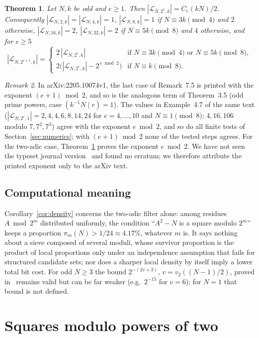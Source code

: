 \documentclass[11pt]{amsart}
\newtheorem{theorem}{Theorem}
\theoremstyle{remark}
\newtheorem{remark}[theorem]{Remark}
\newcommand{\Lset}{\mathcal{L}}
\begin{document}
\begin{theorem}\label{thm:hyp}
Let $N,k$ be odd and $e\ge1$. Then $|\Lset_{N,2^e,k}|=C_e(kN)/2$. Consequently $|\Lset_{N,2,k}|=|\Lset_{N,4,k}|=1$, $|\Lset_{N,8,k}|=1$ if $N\equiv3k\pmod4$ and $2$ otherwise, $|\Lset_{N,16,k}|=2$, $|\Lset_{N,32,k}|=2$ if $N\equiv5k\pmod8$ and $4$ otherwise, and for $e\ge5$
\[
|\Lset_{N,2^{e+1},k}|=
\begin{cases}
2\,|\Lset_{N,2^e,k}| & \text{if } N\equiv3k\pmod 4 \text{ or } N\equiv5k\pmod8,\\
2\bigl(|\Lset_{N,2^e,k}|-2^{\,e \bmod 2}\bigr) & \text{if } N\equiv k\pmod8.
\end{cases}
\]
\end{theorem}

\begin{remark}\label{rem:exponent}
In arXiv:2205.10074v1, the last case of Remark~7.5 is printed with the exponent $(e+1)\bmod 2$, and so is the analogous term of Theorem~3.5 (odd prime powers, case $(k^{-1}N\mid r)=1$). The values in Example~4.7 of the same text ($|\Lset_{N,2^e,1}|=2,4,4,6,8,14,24$ for $e=4,\dots,10$ and $N\equiv1\pmod8$; $4,16,106$ modulo $7,7^2,7^3$) agree with the exponent $e\bmod2$, and so do all finite tests of Section~\ref{sec:numerics}; with $(e+1)\bmod2$ none of the tested steps agrees. For the two-adic case, Theorem~\ref{thm:hyp} proves the exponent $e\bmod 2$. We have not seen the typeset journal version~\cite{hittmeir2023} and found no erratum; we therefore attribute the printed exponent only to the arXiv text.
\end{remark}

\subsection*{Computational meaning}
Corollary~\ref{cor:density} concerns the two-adic filter alone: among residues $A\bmod 2^m$ distributed uniformly, the condition ``$A^2-N$ is a square modulo $2^m$'' keeps a proportion $\pi_m(N)>1/24\approx4.17\%$, whatever $m$ is. It says nothing about a sieve composed of several moduli, whose survivor proportion is the product of local proportions only under an independence assumption that fails for structured candidate sets; nor does a sharper local density by itself imply a lower total bit cost. For odd $N\ge3$ the bound $2^{-(2v+3)}$, $v=v_2((N-1)/2)$, proved in~\cite{khach11517} remains valid but can be far weaker (e.g.\ $2^{-15}$ for $v=6$); for $N=1$ that bound is not defined.

\section{Squares modulo powers of two}
\end{document}
